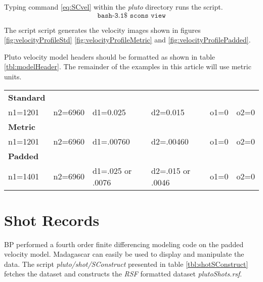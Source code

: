 {
\tiny

\normalsize
}        

Typing command \ref{eq:SCvel} within the \emph{pluto} directory runs the script.
\begin{equation}\label{eq:SCvel} \texttt{bash-3.1\$\ scons\ view} \end{equation}

The script script generates the velocity images shown in figures \ref{fig:velocityProfileStd} \ref{fig:velocityProfileMetric} and \ref{fig:velocityProfilePadded}.  


Pluto velocity model headers should be formatted as shown in table \ref{tbl:modelHeader}.  The remainder of the examples in this article will use metric units.  

{
\begin{tabular}[t]{|llllll|}
	\hline
	\textbf{Standard} &           &              &               &          &       \\
	n1=1201  &   n2=6960 & 	d1=0.025    &  	 d2=0.015   &	o1=0   & o2=0  \\ 
	\textbf{Metric}   &           &              &               &          &       \\
	n1=1201  &   n2=6960 &   d1=.00760  &    d2=.00460  &     o1=0 & o2=0  \\
	\textbf{Padded} & & & & & \\
	n1=1401 &    n2=6960 &	d1=.025 or .0076 & d2=.015 or .0046 & 	o1=0 & o2=0   \\
	\hline
\end{tabular}
}

\section{Shot Records}
BP performed a fourth order finite differencing modeling code on the padded velocity model.  Madagascar can easily be used to display and manipulate the data.  The script \emph{pluto/shot/SConstruct} presented in table \ref{tbl:shotSConstruct} fetches the dataset and constructs the \emph{RSF} formatted dataset \emph{plutoShots.rsf}.  


